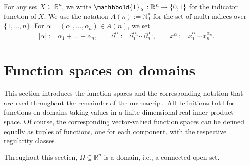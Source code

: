 \documentclass[10pt,a4paper]{amsart}
\theoremstyle{definition}
\theoremstyle{remark}
\numberwithin{equation}{section}
\newcommand{\bbN}{{\mathbb N}}
\newcommand{\bbR}{{\mathbb R}}
\newcommand{\bboldone}{\mathbbold{1}}
\newcommand{\Domain}{{\Omega}}
\begin{document}
For any set $X \subseteq \bbR^{n}$, we write $\bboldone_{X} : \bbR^{n} \to \{0,1\}$ for the indicator function of $X$. 
We use the notation $A(n):=\bbN_{0}^{n}$ for the set of multi-indices over $\{1,\dots,n\}$.
For $\alpha = (\alpha_1, \dots, \alpha_n) \in A(n)$, we set
\begin{gather*}
    |\alpha| := \alpha_1 + \dots + \alpha_n,
    \qquad
    \partial^\alpha
    :=
    \partial_1^{\alpha_1} \cdots \partial_n^{\alpha_n},
    \qquad 
    x^{\alpha} := x_1^{\alpha_1} \cdots x_n^{\alpha_n}.
\end{gather*}

























































\section{Function spaces on domains}\label{section:function-spaces-on-domains}

This section introduces the function spaces and the corresponding notation that are used throughout the remainder of the manuscript. 
All definitions hold for functions on domains taking values in a finite-dimensional real inner product space. 
Of course, the corresponding vector-valued function spaces can be defined equally as tuples of functions, one for each component, with the respective regularity classes. 

Throughout this section, $\Domain \subseteq \bbR^{n}$ is a domain, i.e., a connected open set.
\end{document}
